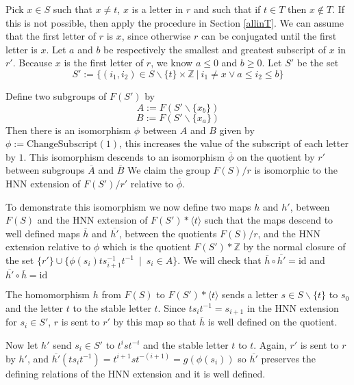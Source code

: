 \documentclass[12pt]{article} %
\theoremstyle{definition}
\theoremstyle{definition}
\theoremstyle{definition}
\theoremstyle{definition}
\begin{document}
Pick $x \in S$ such that $x \ne t$,
  $x$ is a letter in $r$ and such that if $t \in T$ then $x \notin T$.
  If this is not possible, then apply the procedure in Section \ref{allinT}.
We can assume that the first letter of $r$ is
$x$, since otherwise $r$ can be conjugated until the first letter is $x$.
Let $a$ and $b$ be respectively the
smallest and greatest subscript of $x$ in $r'$. Because $x$ is the first
letter of $r$, we know $a \le 0$ and $b \ge 0$. Let $S'$ be the set
\begin{equation}
S' := \{(i_1, i_2) \in S \backslash \{t\} \times \mathbb{Z} \
| \ i_1 \ne x \vee a \le i_2 \le b \}
\end{equation}

Define two subgroups of $F(S')$ by
\begin{equation}
  A := F(S' \backslash \{x_b\})
\end{equation}
\begin{equation}
  B := F(S' \backslash \{x_a\})
\end{equation}
Then there is an isomorphism $\phi$ between $A$ and $B$ given by
$\phi := \text{ChangeSubscript}(1)$, this
increases the value of the subscript of each letter by $1$.
This isomorphism descends to an isomorphism
$\overline{\phi}$ on the quotient by $r'$ between subgroups $\overline{A}$ and $\overline{B}$
We claim the group $F(S) / r$ is isomorphic to the HNN extension of
$F(S') / r'$ relative to $\overline{\phi}$.

To demonstrate this isomorphism we now define two maps $h$ and $h'$,
between $F(S)$ and the HNN extension of $F(S') \ast \langle t \rangle$ such that
the maps descend to well defined maps $\overline{h}$ and $\overline{h'}$, between the quotients
$F(S) / r$, and the HNN extension relative to $\phi$ which is the
quotient $F(S') \ast \mathbb{Z}$ by the normal closure of the set
$\{r'\} \cup \{\phi(s_i)ts_{i+1}^{-1}t^{-1} \ \mid \ s_i \in A\}$.
We will check that $\overline{h} \circ \overline{h'} = \text{id}$ and
$\overline{h'} \circ \overline{h} = \text{id}$

The homomorphism $h$ from $F(S)$ to $F(S') \ast \langle t \rangle$ sends a letter
$s \in S \backslash \{t\}$ to $s_0$ and
the letter $t$ to the stable letter $t$.
Since $t s_i t^{-1} = s_{i+1}$ in
the HNN extension for $s_i \in S'$,
$r$ is sent to $r'$ by this map so that $\overline{h}$ is well defined
on the quotient.

Now let $h'$ send $s_i \in S'$ to $t^{i} s t^{-i}$ and the stable letter $t$ to $t$.
Again, $r'$ is sent to $r$ by $h'$, and $\overline{h'} (t s_i t^{-1}) = t^{i+1} s t^{-(i+1)} =
g (\phi (s_i))$ so $\overline{h'}$ preserves the defining relations of the HNN extension and it
is well defined.
\end{document}
